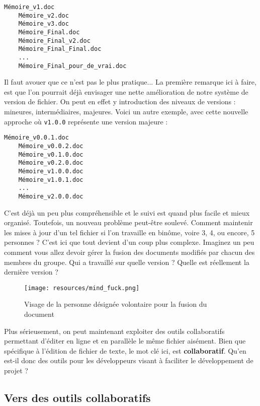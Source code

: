 \documentclass[11pt,a4paper,oneside]{article}
\begin{document}
\begin{lstlisting}[style=custombash]
	Mémoire_v1.doc
	Mémoire_v2.doc
	Mémoire_v3.doc
	Mémoire_Final.doc
	Mémoire_Final_v2.doc
	Mémoire_Final_Final.doc
	...
	Mémoire_Final_pour_de_vrai.doc
\end{lstlisting}

\vspace{2mm}
Il faut avouer que ce n'est pas le plus pratique... La première remarque ici à faire, est que l'on pourrait déjà envisager une nette amélioration de notre système de version de fichier. On peut en effet y introduction des niveaux de versions : mineures, intermédiaires, majeures. Voici un autre exemple, avec cette nouvelle approche où \texttt{v1.0.0} représente une version majeure : 
   
\begin{lstlisting}[style=custombash]
	Mémoire_v0.0.1.doc
	Mémoire_v0.0.2.doc
	Mémoire_v0.1.0.doc
	Mémoire_v0.2.0.doc
	Mémoire_v1.0.0.doc
	Mémoire_v1.0.1.doc
	...
	Mémoire_v2.0.0.doc
\end{lstlisting}

\vspace{2mm}
C'est déjà un peu plus compréhensible et le suivi est quand plus facile et mieux organisé. Toutefois, un nouveau problème peut-être soulevé. Comment maintenir les mises à jour d'un tel fichier si l'on travaille en binôme, voire 3, 4, ou encore, 5 personnes ? C'est ici que tout devient d'un coup plus complexe. Imaginez un peu comment vous allez devoir gérer la fusion des documents modifiés par chacun des membres du groupe. Qui a travaillé sur quelle version ? Quelle est réellement la dernière version ?

\begin{figure}[ht]
	\centering
	\texttt{[image: resources/mind\_fuck.png]}
	\caption{Visage de la personne désignée volontaire pour la fusion du document}
\end{figure}

Plus sérieusement, on peut maintenant exploiter des outils collaboratifs permettant d'éditer en ligne et en parallèle le même fichier aisément. Bien que spécifique à l'édition de fichier de texte, le mot clé ici, est \textbf{collaboratif}. Qu'en est-il donc des outils pour les développeurs visant à faciliter le développement de projet ?

\subsection{Vers des outils collaboratifs}
\end{document}

